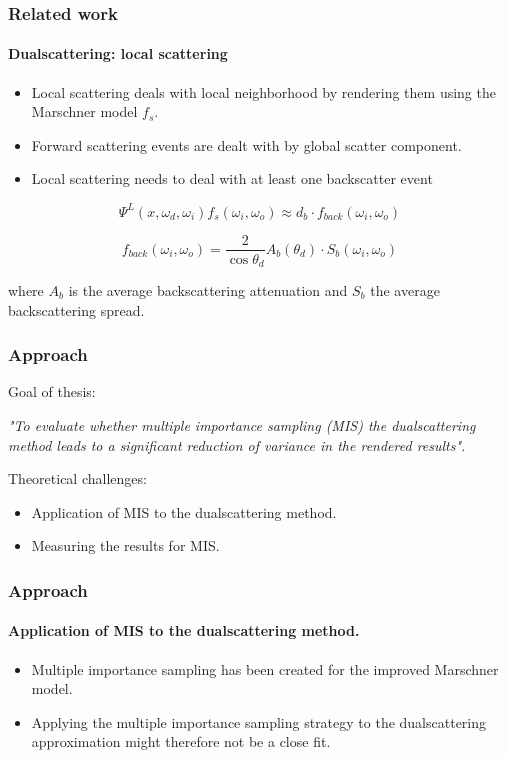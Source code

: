 \documentclass{beamer}
\begin{document}
   \begin{frame}
    \frametitle{Related work}
    \framesubtitle{Dualscattering: local scattering}

\begin{itemize}    
\item Local scattering deals with local neighborhood by rendering them using the Marschner model $f_s$.
\item Forward scattering events are dealt with by global scatter component.
\item Local scattering needs to deal with at least one backscatter event
\end{itemize}

\begin{equation}
\Psi^L(x, \omega_d, \omega_i) f_s(\omega_i,\omega_o) \approx d_b \cdot f_{back}(\omega_i, \omega_o)
\end{equation}

\begin{equation}
f_{back}(\omega_i, \omega_o) = \frac{2}{\cos \theta_d} A_b(\theta_d) \cdot S_b(\omega_i, \omega_o)
\end{equation}

where $A_b$ is the average backscattering attenuation and $S_b$ the average backscattering spread.
    
  \end{frame}
  
  \begin{frame}
    \frametitle{Approach}
	Goal of thesis:
	
	\begin{center}
	\textit{"To evaluate whether multiple importance sampling (MIS) the dualscattering method leads to a significant reduction of variance in the rendered results".}
	\end{center}
	
	Theoretical challenges:
	\begin{itemize}
	\item Application of MIS to the dualscattering method.
	\item Measuring the results for MIS.
	\end{itemize}
	
  \end{frame}
  
  \begin{frame}
  \frametitle{Approach}
  \framesubtitle{Application of MIS to the dualscattering method.}
  
  \begin{itemize}
  \item Multiple importance sampling has been created for the improved Marschner model.
  \item Applying the multiple importance sampling strategy to the dualscattering approximation might therefore not be a close fit.
  \end{itemize}
  \end{frame}
  
\end{document}
